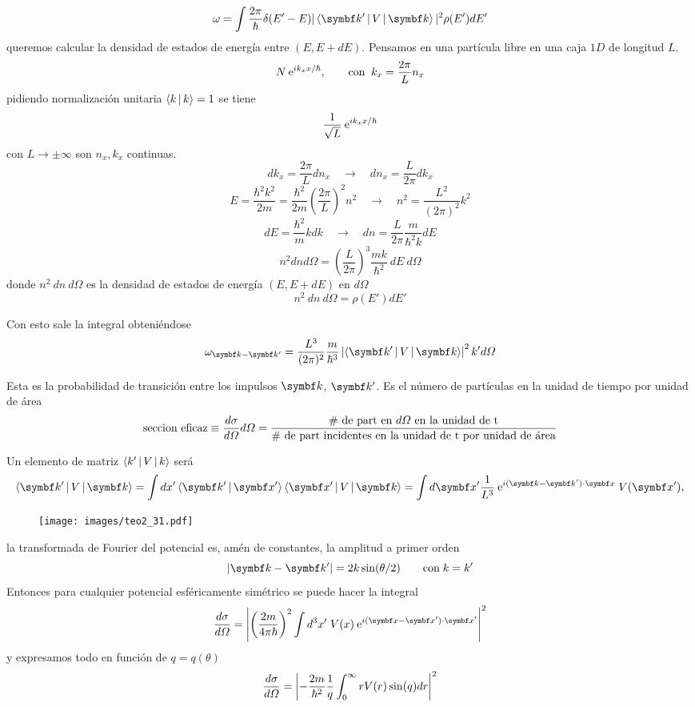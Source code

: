 \documentclass[10pt,oneside]{CBFT_book}
\begin{document}
\[
	\omega = \int \frac{2\pi}{\hbar}  \delta(E'-E) |\Braket{\vb{k}'|V|\vb{k}}|^2 \rho(E') dE'
\]
queremos calcular la densidad de estados de energía entre $(E,E+dE)$. Pensamos en una partícula libre en una 
caja $1D$ de longitud $L$.
\[
	N \:\mathrm{e}^{i k_x x /\hbar}, \qquad \text{con} \;\; k_x = \frac{2\pi}{L}n_x
\]
pidiendo normalización unitaria $\Braket{k|k}=1$ se tiene 
\[
	\frac{1}{\sqrt{L}} \:\mathrm{e}^{i k_x x /\hbar}
\]
con $L\to\pm\infty$ son $n_x,k_x$ continuas.
\[
	dk_x = \frac{2\pi}{L} dn_x \quad \longrightarrow \quad  dn_x = \frac{L}{2\pi} dk_x 
\]
\[
	E = \frac{\hbar^2k^2}{2m} = \frac{\hbar^2}{2m} \left( \frac{2\pi}{L}\right)^2 n^2 \quad 
	\longrightarrow \quad n^2 = \frac{L^2}{(2\pi)^2}k^2
\]
\[
	dE = \frac{\hbar^2}{m} k dk \quad \longrightarrow \quad dn = \frac{L}{2\pi}\frac{m}{\hbar^2 k} dE
\]
\[
	n^2 dn d\Omega = \left( \frac{L}{2\pi} \right)^3 \frac{mk}{\hbar^2} \:dE \:d\Omega
\]
donde $n^2\:dn\:d\Omega$ es la densidad de estados de energía $(E,E+dE)$ en $d\Omega$
\[
	n^2 \: dn \: d\Omega = \rho(E') dE'
\]

Con esto sale la integral obteniéndose
\[
	\omega_{\vb{k}-\vb{k}'} = 
	\frac{L^3}{(2\pi)^2} \frac{m}{\hbar^3} \left|\Braket{\vb{k}'|V|\vb{k}}\right|^2 k'd\Omega
\]

Esta es la probabilidad de transición entre los impulsos $\vb{k}$, $\vb{k}'$. Es el número de partículas en 
la unidad de tiempo por unidad de área 
\[
	\text{seccion eficaz} \equiv \frac{d^{\hspace{-0.05em}} {\sigma}}{d {\Omega}^{\hspace{-0.05em}}}d\Omega =
	\frac{\text{\# de part en $d\Omega$ en la unidad de t}}
	{\text{\# de part incidentes en la unidad de t por unidad de área}}
\]

Un elemento de matriz $\Braket{k'|V|k}$ será 
\[
	\Braket{\vb{k}'|V|\vb{k}} = \int dx'\Braket{\vb{k}'|\vb{x}'} \Braket{\vb{x}'|V|\vb{k}} =
	\int d\vb{x}' \frac{1}{L^3} \euler^{i (\vb{k}-\vb{k}')\cdot \vb{x}} \; V(\vb{x}'),
\]
\begin{figure}[htb]
	\begin{center}
	\texttt{[image: images/teo2\_31.pdf]}
	\end{center}
	\caption{}
\end{figure} 
la transformada de Fourier del potencial es, amén de constantes, la amplitud a primer orden 
\[
	|\vb{k} - \vb{k}'| = 2k\sin(\theta/2) \qquad \text{con} \; k=k' 
\]
Entonces para cualquier potencial esféricamente simétrico se puede hacer la integral 
\[
	\dtot{\sigma}{\Omega} =
	\left|\left( \frac{2m}{4\pi\hbar}\right)^2 \int d^3x'\;V(x)\euler^{i(\vb{x}-\vb{x}')\cdot\vb{x}'}\right|^2
\]
y expresamos todo en función de $q=q(\theta)$
\[
	\frac{d^{\hspace{-0.05em}} {\sigma}}{d {\Omega}^{\hspace{-0.05em}}} =
	\left| -\frac{2m}{\hbar^2} \frac{1}{q} \int_0^\infty rV(r)\sin(q) dr \right|^2
\]
\end{document}
